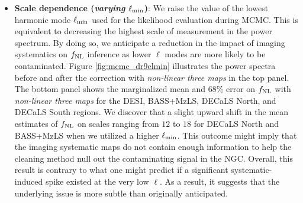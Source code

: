 \begin{itemize}[itemindent=*]
\item \textbf{Scale dependence (\textit{varying $\ell_{\rm min}$})}: We raise the value of the lowest harmonic mode $\ell_{\rm min}$ used for the likelihood evaluation during MCMC. This is equivalent to decreasing the highest scale of measurement in the power spectrum. By doing so, we anticipate a reduction in the impact of imaging systematics on $f_{\rm NL}$ inference as lower $\ell$ modes are more likely to be contaminated. Figure \ref{fig:mcmc_dr9elmin} illustrates the power spectra before and after the correction with \textit{non-linear three maps} in the top panel. The bottom panel shows the marginalized mean and $68\%$ error on $f_{\rm NL}$ with \textit{non-linear three maps} for the DESI, BASS+MzLS, DECaLS North, and DECaLS South regions. We discover that a slight upward shift in the mean estimates of $f_{\rm NL}$ on scales ranging from $12$ to $18$ for DECaLS North and BASS+MzLS when we utilized a higher $\ell_{\rm min}$. This outcome might imply that the imaging systematic maps do not contain enough information to help the cleaning method null out the contaminating signal in the NGC. Overall, this result is contrary to what one might predict if a significant systematic-induced spike existed at the very low $\ell$. As a result, it suggests that the underlying issue is more subtle than originally anticipated. %
\end{itemize}

